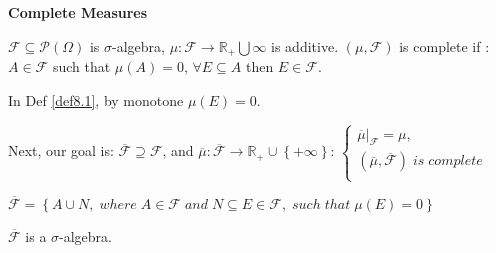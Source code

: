 \setcounter{lecture}{8}
\begin{center}
	\Large \bf Complete Measures
\end{center}
\vspace{0.25cm}

\begin{definition}
	$ \mathcal{F} \subseteq \mathcal{P}(\Omega) $ is $ \sigma $-algebra, $ \mu: \mathcal{F} \to \mathbb{R}_{+} \bigcup{\infty} $ is  additive. $ (\mu, \mathcal{F}) $ is complete if :
	$ A \in \mathcal{F} $ such that $ \mu(A) = 0 $, $ \forall E \subseteq A $ then $ E \in \mathcal{F}. $
	\label{def8.1}
\end{definition}

\begin{remark}
	In Def \ref{def8.1}, by monotone $\mu \left( E \right) = 0$.
	\label{rmk8.1}
\end{remark}

Next, our goal is: $\overline {\mathcal{F}}  \supseteq \mathcal{F}$, and $\overline \mu  :\overline {\mathcal{F}}  \to {{\mathbb{R}}_ + } \cup \left\{ { + \infty } \right\}$: $ \left\{ {\begin{matrix}
	{\overline \mu  {|_{\mathcal{F}}} = \mu }, \qquad \qquad \qquad   \\ 
	{\left( {\overline \mu  ,\overline {\mathcal{F}} } \right)\;is\;complete}  \\ 
	
	\end{matrix} } \right. $

\begin{definition}
	$\overline {\mathcal{F}}  = \left\{ {A \cup N,\;where\;A \in {\mathcal{F}}\;and\;N \subseteq E \in {\mathcal{F}},\;such\;that\;\mu \left( E \right) = 0} \right\}$
	\label{def8.2}
\end{definition}

\begin{claim}
	$ \overline {\mathcal{F}} $ is a $ \sigma $-algebra.
	\label{cla8.1}
\end{claim}
 
